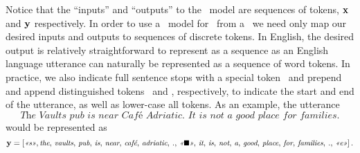 Notice that the ``inputs'' and ``outputs'' to the \sequencetosequence~model are sequences of tokens, 
$\mathbf{x}$ and $\mathbf{y}$ respectively.
In order to use a \sequencetosequence~model for \naturallanguagegeneration~from a 
\meaningrepresentation~we need only map our desired inputs and outputs to sequences of discrete tokens. In English, the desired output is relatively straightforward to represent as 
a sequence as an English language 
utterance can naturally be represented as a sequence of word tokens. In practice, we also indicate full sentence stops with a special token \senttok~and prepend and append distinguished tokens \starttok~and \stoptok, respectively, to indicate the start and 
end of the utterance, as well as lower-case all tokens. As an example, the utterance 
\[\textit{The Vaults pub is near Caf{\'e} Adriatic. It is not a good place for families.} \]
would be represented as 
\[\small \mathbf{y} = \left[\textit{<<s>>}, \textit{the},\,\textit{vaults},\,\textit{pub},\,\textit{is},\,\textit{near},\,\textit{caf{\'e}},\,\textit{adriatic},\,\textit{.},\,\textit{\textit{<<$\blacksquare$>>}},\,\textit{it},\,\textit{is},\,\textit{not},\,\textit{a},\,\textit{good},\,\textit{place},\,\textit{for},\,\textit{families},\,\textit{.},\,\textit{\textit{<<e>>}}\right]. \]

